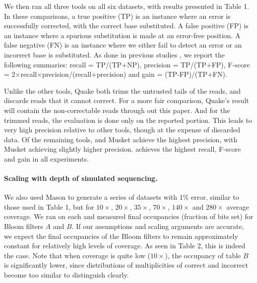 \documentclass{bmcart}
\begin{document}
We then ran all three tools on all six datasets, with results presented in Table 1.  In these comparisons, a true positive (TP) is an instance where an error is successfully corrected, \thatis with the correct base substituted.  A false positive (FP) is an instance where a spurious substitution is made at an error-free position.  A false negative (FN) is an instance where we either fail to detect an error or an incorrect base is substituted.  As done in previous studies \cite{liu2013musket}, we report the following summaries: recall = TP/(TP$+$NP), precision = TP/(TP$+$FP), F-score = 2$\times$recall$\times$precision/(recall$+$precision) and gain = (TP-FP)/(TP+FN).

Unlike the other tools, Quake both trims the untrusted tails of the reads, and discards reads that it cannot correct. For a more fair comparison, Quake's result will contain the non-correctable reads through out this paper. And for the trimmed reads, the evaluation is done only on the reported portion. This leads to very high precision relative to other tools, though at the expense of discarded data.  Of the remaining tools, \tool and Musket achieve the highest precision, with Musket achieving slightly higher precision.  \tool achieves the highest recall, F-score and gain in all experiments.

\paragraph{Scaling with depth of simulated sequencing.} We also used Mason to generate a series of datasets with 1\% error, similar to those used in Table 1, but for $10\times$, $20\times$, $35\times$, $70\times$, $140\times$ and $280\times$ average coverage.  We ran \tool on each and measured final occupancies (fraction of bits set) for Bloom filters $A$ and $B$.  If our assumptions and scaling arguments are accurate, we expect the final occupancies of the Bloom filters to remain approximately constant for relatively high levels of coverage.  As seen in Table 2, this is indeed the case.  Note that when coverage is quite low ($10\times$), the occupancy of table $B$ is significantly lower, since distributions of multiplicities of correct and incorrect \kmers become too similar to distinguish clearly.


\end{document}
